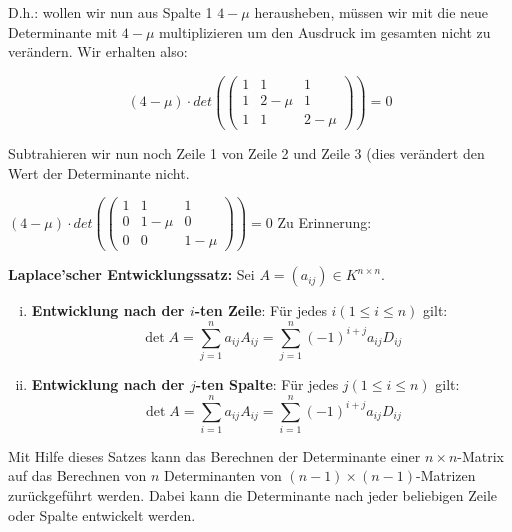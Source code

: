 \begin{uebsp}
\begin{Answer}
{
D.h.: wollen wir nun aus Spalte 1  $4-\mu $ herausheben, m\"ussen wir
mit die neue Determinante mit  $4-\mu $ multiplizieren um den Ausdruck
im gesamten nicht zu ver\"andern. Wir erhalten also:}





\begin{equation*}
(4-\mu )\cdot \mathit{det}(\left(\begin{matrix}1&1&1\\1&2-\mu
&1\\1&1&2-\mu \end{matrix}\right))=0
\end{equation*}


{
Subtrahieren wir nun noch Zeile 1 von Zeile 2 und Zeile 3 (dies
ver\"andert den Wert der Determinante nicht.}



{
 $(4-\mu )\cdot \mathit{det}(\left(\begin{matrix}1&1&1\\0&1-\mu
&0\\0&0&1-\mu \end{matrix}\right))=0$  Zu Erinnerung: }

\begin{uebsp_theory}\textbf{Laplace'scher Entwicklungssatz:} Sei $A=(a_{ij})\in K^{n\times n}$.
    \begin{enumerate}[i)]
        \item \textbf{Entwicklung nach der $i$-ten Zeile}: Für jedes $i(1\leq i\leq n)$ gilt:    
            \[\det A=\sum_{j=1}^na_{ij}A_{ij}=\sum_{j=1}^n(-1)^{i+j}a_{ij}D_{ij}\]
        \item \textbf{Entwicklung nach der $j$-ten Spalte}: Für jedes $j(1\leq i\leq n)$ gilt:
            \[\det A=\sum_{i=1}^na_{ij}A_{ij}=\sum_{i=1}^n(-1)^{i+j}a_{ij}D_{ij}\] 
    \end{enumerate}
    Mit Hilfe dieses Satzes kann das Berechnen der Determinante einer $n\times n$-Matrix auf das Berechnen von $n$ Determinanten von $(n-1)\times (n-1)$-Matrizen zurückgeführt werden. Dabei kann die Determinante nach jeder beliebigen Zeile oder Spalte entwickelt werden.
\end{uebsp_theory}


\end{Answer}
\end{uebsp}
